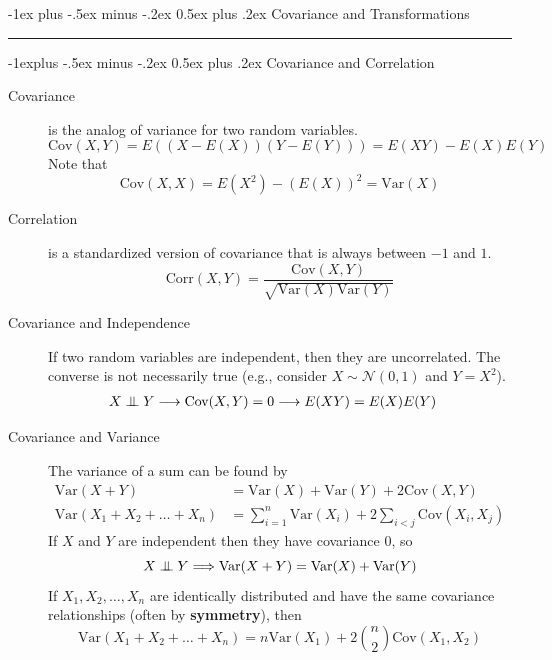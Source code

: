 \documentclass[10pt,landscape]{article}
\makeatletter
\newcommand\independent{\protect\mathpalette{\protect\independenT}{\perp}}
\def\independenT#1#2{\mathrel{\setbox0\hbox{$#1#2$}%
\copy0\kern-\wd0\mkern4mu\box0}}
\newcommand{\var}{\textrm{Var}}
\newcommand{\cov}{\textrm{Cov}}
\newcommand{\corr}{\textrm{Corr}}
\newcommand{\N}{\mathcal{N}}
\renewcommand{\section}{\@startsection{section}{1}{0mm}%
{-1ex plus -.5ex minus -.2ex}%
{0.5ex plus .2ex}%
{\normalfont\large\bfseries}}
\renewcommand{\subsection}{\@startsection{subsection}{2}{0mm}%
{-1explus -.5ex minus -.2ex}%
{0.5ex plus .2ex}%
{\normalfont\normalsize\bfseries}}
\makeatother
\begin{document}
\begin{multicols*}{3}
        \section{Covariance and Transformations}\smallskip \hrule height 2pt \smallskip

        \subsection{Covariance and Correlation}
        \begin{description}
            \item [Covariance] is the analog of variance for two random variables.
            \[\cov(X, Y) = E\left((X - E(X))(Y - E(Y))\right) = E(XY) - E(X)E(Y)\]
            Note that
            \[\cov(X, X) = E(X^2) - (E(X))^2 =  \var(X)\]
            \item [Correlation] is a standardized version of covariance that is always between $-1$ and $1$.
            \[\corr(X, Y) = \frac{\cov(X, Y)}{\sqrt{\var(X)\var(Y)}} \]
            \item [Covariance and Independence] If two random variables are independent, then they are uncorrelated. The converse is not necessarily true (e.g., consider $X \sim \N(0,1)$ and $Y=X^2$).
            \begin{align*}
                X \independent Y & \longrightarrow \cov(X, Y) = 0 \longrightarrow E(XY) = E(X)E(Y)
            \end{align*}
            \item [Covariance and Variance]  The variance of a sum can be found by
            \begin{align*}
                \var(X + Y)                    & = \var(X) + \var(Y) + 2\cov(X, Y)                          \\
                \var(X_1 + X_2 + \dots + X_n ) & = \sum_{i = 1}^{n}\var(X_i) + 2\sum_{i < j} \cov(X_i, X_j)
            \end{align*}
            If $X$ and $Y$ are independent then they have covariance $0$, so
            \[X \independent Y \Longrightarrow \var(X + Y) = \var(X) + \var(Y)\]
            If $X_1, X_2, \dots, X_n$ are identically distributed and have the same covariance relationships (often by \textbf{symmetry}), then
            \[\var(X_1 + X_2 + \dots + X_n ) = n\var(X_1) + 2{n \choose 2}\cov(X_1, X_2)\]

\end{description}
\end{multicols*}
\end{document}
